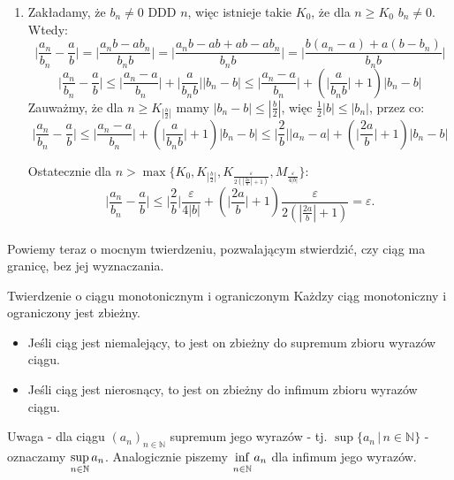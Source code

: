 \documentclass{article}
\numberwithin{defi}{section}
\numberwithin{defi}{section}
\newcommand{\N}{\mathbb{N}}
\renewcommand{\inf}{\mathop{\mathrm{inf}\vphantom{\mathrm{sup}}}}
\providecommand{\eps}{\varepsilon}
\newcommand{\ciag}[1]{(#1_{n})_{n \in \N}}
\begin{document}
\begin{dow}
\begin{enumerate}
        \item Zakładamy, że $b_n \neq 0$ DDD $n$, więc istnieje takie $K_0$, że dla $n \geqslant K_0$ $b_n \neq 0$. Wtedy: \begin{equation}
                  \Big| \frac{a_n}{b_n} - \frac{a}{b} \Big| = \Big| \frac{a_n b - a b_n}{b_n b} \Big| = \Big| \frac{a_n b - ab + ab - a b_n}{b_n b} \Big| = \Big| \frac{b(a_n - a) + a(b -b_n)}{b_n b} \Big|
              \end{equation} \begin{equation}
                  \Big| \frac{a_n}{b_n} - \frac{a}{b} \Big| \leqslant \Big| \frac{a_n - a}{b_n} \Big| + \Big| \frac{a}{b_n b} \Big| \Big| b_n - b \Big| \leqslant \Big| \frac{a_n - a}{b_n} \Big| + (\Big| \frac{a}{b_n b} \Big| +1) \Big| b_n - b \Big|
              \end{equation}
              Zauważmy, że dla $n \geqslant K_{|\frac{b}{2}|}$ mamy $|b_n - b| \leqslant |\frac{b}{2}|$, więc $\frac{1}{2}|b| \leqslant |b_n|$, przez co: \begin{equation}
                  \Big| \frac{a_n}{b_n} - \frac{a}{b} \Big| \leqslant \Big| \frac{a_n - a}{b_n} \Big| + (\Big| \frac{a}{b_n b} \Big| +1) \Big| b_n - b \Big| \leqslant \Big| \frac{2}{b} \Big| \Big|a_n - a\Big| + (\Big| \frac{2 a}{b} \Big| +1) \Big| b_n - b \Big|
              \end{equation}

              Ostatecznie dla $n > \max\{K_0, K_{|\frac{b}{2}|}, K_{\frac{\eps}{2 (| \frac{2 a}{b} | +1)}}, M_{\frac{\eps}{4|b|}} \}:$ \begin{equation}
                  \Big| \frac{a_n}{b_n} - \frac{a}{b} \Big| \leqslant \Big| \frac{2}{b} \Big| \frac{\eps}{4|b|} + (\Big| \frac{2 a}{b} \Big| +1) \frac{\eps}{2 (| \frac{2 a}{b} | +1)}  = \eps.
              \end{equation}


    \end{enumerate}
\end{dow}

\paragraph{} Powiemy teraz o mocnym twierdzeniu, pozwalającym stwierdzić, czy ciąg ma granicę, bez jej wyznaczania.
\begin{twier}{Twierdzenie o ciągu monotonicznym i ograniczonym}
    Każdzy ciąg monotoniczny i ograniczony jest zbieżny. \begin{itemize}
        \item Jeśli ciąg jest niemalejący, to jest on zbieżny do supremum zbioru wyrazów ciągu.
        \item Jeśli ciąg jest nierosnący, to jest on zbieżny do infimum zbioru wyrazów ciągu.

    \end{itemize}
    Uwaga - dla ciągu $\ciag{a}$ supremum jego wyrazów - tj. $\sup \{ a_n \, | \, n \in \N \}$ - oznaczamy $\mathlarger{\sup}_{n \in \N} \, a_n$. Analogicznie piszemy $\mathlarger{\inf}_{n \in \N} \, a_n$ dla infimum jego wyrazów.
\end{twier}
\end{document}
